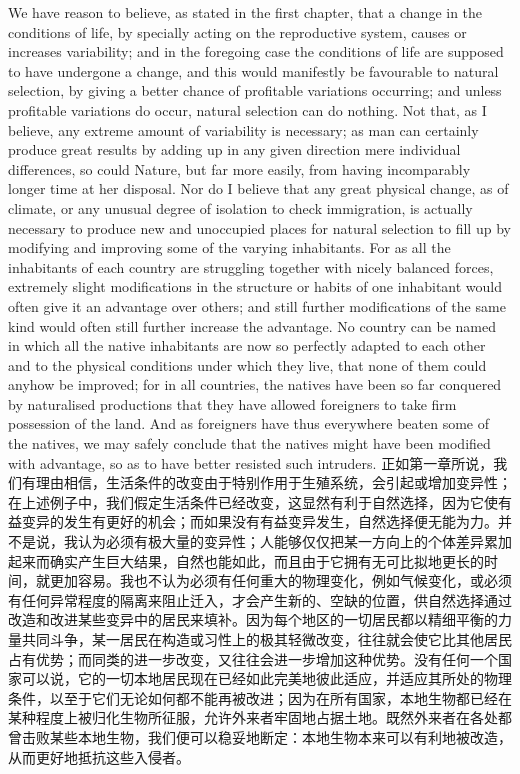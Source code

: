 \darwinpair
{We have reason to believe, as stated in the first chapter, that a change in the conditions of life, by specially acting on the reproductive system, causes or increases variability; and in the foregoing case the conditions of life are supposed to have undergone a change, and this would manifestly be favourable to natural selection, by giving a better chance of profitable variations occurring; and unless profitable variations do occur, natural selection can do nothing. Not that, as I believe, any extreme amount of variability is necessary; as man can certainly produce great results by adding up in any given direction mere individual differences, so could Nature, but far more easily, from having incomparably longer time at her disposal. Nor do I believe that any great physical change, as of climate, or any unusual degree of isolation to check immigration, is actually necessary to produce new and unoccupied places for natural selection to fill up by modifying and improving some of the varying inhabitants. For as all the inhabitants of each country are struggling together with nicely balanced forces, extremely slight modifications in the structure or habits of one inhabitant would often give it an advantage over others; and still further modifications of the same kind would often still further increase the advantage. No country can be named in which all the native inhabitants are now so perfectly adapted to each other and to the physical conditions under which they live, that none of them could anyhow be improved; for in all countries, the natives have been so far conquered by naturalised productions that they have allowed foreigners to take firm possession of the land. And as foreigners have thus everywhere beaten some of the natives, we may safely conclude that the natives might have been modified with advantage, so as to have better resisted such intruders.}
{正如第一章所说，我们有理由相信，生活条件的改变由于特别作用于生殖系统，会引起或增加变异性；在上述例子中，我们假定生活条件已经改变，这显然有利于自然选择，因为它使有益变异的发生有更好的机会；而如果没有有益变异发生，自然选择便无能为力。并不是说，我认为必须有极大量的变异性；人能够仅仅把某一方向上的个体差异累加起来而确实产生巨大结果，自然也能如此，而且由于它拥有无可比拟地更长的时间，就更加容易。我也不认为必须有任何重大的物理变化，例如气候变化，或必须有任何异常程度的隔离来阻止迁入，才会产生新的、空缺的位置，供自然选择通过改造和改进某些变异中的居民来填补。因为每个地区的一切居民都以精细平衡的力量共同斗争，某一居民在构造或习性上的极其轻微改变，往往就会使它比其他居民占有优势；而同类的进一步改变，又往往会进一步增加这种优势。没有任何一个国家可以说，它的一切本地居民现在已经如此完美地彼此适应，并适应其所处的物理条件，以至于它们无论如何都不能再被改进；因为在所有国家，本地生物都已经在某种程度上被归化生物所征服，允许外来者牢固地占据土地。既然外来者在各处都曾击败某些本地生物，我们便可以稳妥地断定：本地生物本来可以有利地被改造，从而更好地抵抗这些入侵者。}

